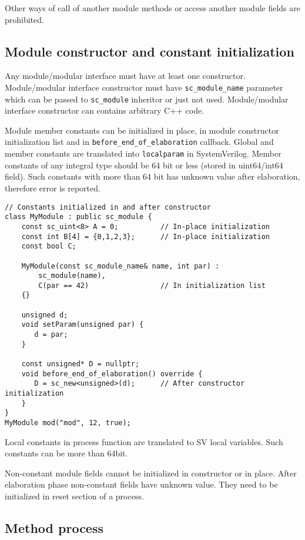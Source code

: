 Other ways of call of another module methods or access another module fields are prohibited. 


\subsection{Module constructor and constant initialization}

Any module/modular interface must have at least one constructor. Module/modular interface constructor must have {\tt sc\_module\_name} parameter which can be passed to {\tt sc\_module} inheritor or just not used. Module/modular interface constructor can contains arbitrary C++ code. 

Module member constants can be initialized in place, in module constructor initialization list and in {\tt before\_end\_of\_elaboration} callback. Global and member constants are translated into {\tt localparam} in SystemVerilog. 
Member constants of any integral type should be 64 bit or less (stored in uint64/int64 field). Such constants with more than 64 bit has unknown value after 
elaboration, therefore error is reported.

\begin{lstlisting}[style=mycpp]
// Constants initialized in and after constructor
class MyModule : public sc_module {
    const sc_uint<8> A = 0;          // In-place initialization
    const int B[4] = {0,1,2,3};      // In-place initialization
    const bool C;       
    
    MyModule(const sc_module_name& name, int par) :
        sc_module(name), 
        C(par == 42)                 // In initialization list
    {}
    
    unsigned d;
    void setParam(unsigned par) {
       d = par;
    }
    
    const unsigned* D = nullptr;
    void before_end_of_elaboration() override {
       D = sc_new<unsigned>(d);	     // After constructor initialization
    }
}
MyModule mod("mod", 12, true);
\end{lstlisting}

Local constants in process function are translated to SV local variables. Such constants can be more than 64bit.

Non-constant module fields cannot be initialized in constructor or in place. After elaboration phase non-constant fields have unknown value. They need to be initialized in reset section of a process. 

\subsection{Method process}


